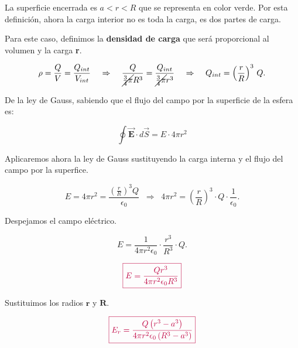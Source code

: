 \documentclass[a4paper,12pt]{article} %
\begin{document}
\begin{justify}
	La superficie encerrada es \( a < r < R  \) que se representa en color verde. Por esta definición, ahora la carga interior no es toda la carga, es dos partes de carga.
\end{justify}

\begin{justify}
	Para este caso, definimos la \textbf{densidad de carga} que será proporcional al volumen y la carga \textbf{r}.
\end{justify}

\vspace{\baselineskip}

\[ \rho = \frac{Q}{V}= \frac{Q_{int}}{V_{int}} \;\;\;\; \Rightarrow \;\;\;\; \frac{Q}{\cancel{\frac{3}{4}\pi} R^3}= \frac{Q_{int}}{\cancel{\frac{3}{4}\pi} r^3} \;\;\;\; \Rightarrow \;\;\;\; Q_{int} = \left( \frac{r}{R} \right)^3 \, Q. \]

\begin{justify}
	De la ley de Gauss, sabiendo que el flujo del campo por la superficie de la esfera es:
\end{justify}

\[ \oint \vec{\mathbf{E}} \cdot d \vec{S} = E \cdot 4 \pi r^2 \]

\begin{justify}
	Aplicaremos ahora la ley de Gauss sustituyendo la carga interna y el flujo del campo por la superfice.
\end{justify}

\[ E = 4\pi r^2 = \frac{\left(\frac{r}{R}\right)^3Q}{\epsilon_0} \;\; \Rightarrow \;\; 4 \pi r^2 = \left(\frac{r}{R}\right)^3 \cdot Q \cdot \frac{1}{\epsilon_0}. \]

\begin{justify}
	Despejamos el campo eléctrico.
\end{justify}

\[ E = \frac{1}{4 \pi r^2 \epsilon_0} \cdot \frac{r^{3}}{R^3} \cdot Q. \]

\vspace{\baselineskip}

\[ \textcolor{purple}{\boxed{ E = \frac{Q r^3}{4 \pi r^2 \epsilon_0 R^3} }}\]

\begin{justify}
	Sustituimos los radios \(\mathbf{r}\) y \(\mathbf{R}\).
\end{justify}

\[ \textcolor{purple}{\boxed{ E_r = \frac{Q \left( r^3 - a^3 \right)}{4 \pi r^2 \epsilon_0 \left(R^3 - a^3\right)}}} \]
\end{document}
